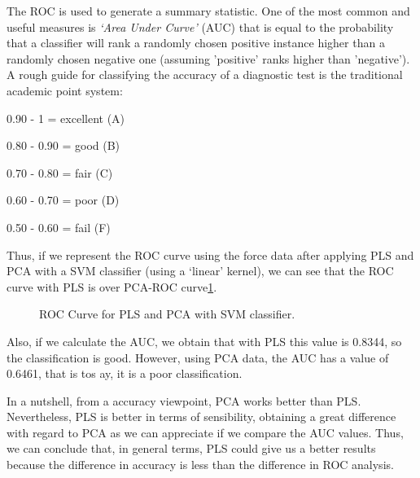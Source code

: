 The ROC is used to generate a summary statistic. One of the most common and useful measures is \textit{‘Area Under Curve’} (AUC) that is equal to the probability that a classifier will rank a randomly chosen positive instance higher than a randomly chosen negative one (assuming 'positive' ranks higher than 'negative'). A rough guide for classifying the accuracy of a diagnostic test is the traditional academic point system\cite{ROC2}:

0.90 - 1 = excellent (A)

0.80 - 0.90 = good (B)	

0.70 - 0.80 = fair (C)

0.60 - 0.70 = poor (D)

0.50 - 0.60 = fail (F)

Thus, if we represent the ROC curve using the force data after applying PLS and PCA with a SVM classifier (using a ‘linear’ kernel), we can see that the ROC curve with PLS is over PCA-ROC curve\ref{fig:ROC}.
\begin{figure}[H]
	\centering
	\caption{ROC Curve for PLS and PCA with SVM classifier.}
	\label{fig:ROC}
\end{figure}

Also, if we calculate the AUC, we obtain that with PLS this value is 0.8344, so the classification is good. However, using PCA data, the AUC has a value of 0.6461, that is tos ay, it is a poor classification.

In a nutshell, from a accuracy viewpoint, PCA works better than PLS. Nevertheless, PLS is better in terms of sensibility, obtaining a great difference with regard to PCA as we can appreciate if we compare the AUC values. Thus, we can conclude that, in general terms, PLS could give us a better results because the difference in accuracy is less than the difference in ROC analysis. 
